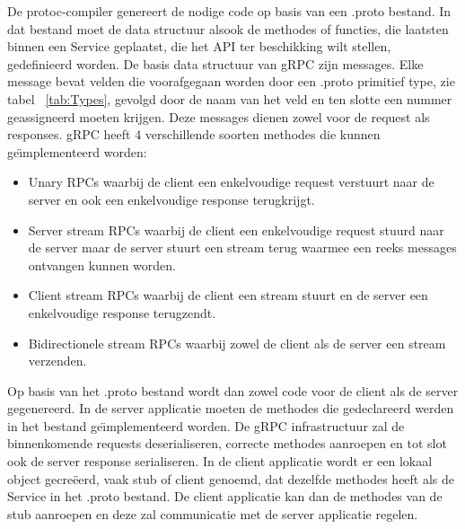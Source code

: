De protoc-compiler genereert de nodige code op basis van een .proto bestand. In dat bestand moet de data structuur alsook de methodes
of functies, die laatsten binnen een Service geplaatst, die het API ter beschikking wilt stellen, gedefinieerd worden.
De basis data structuur van gRPC zijn messages. Elke message bevat velden
die voorafgegaan worden door een .proto primitief type, zie tabel ~\ref{tab:Types}, gevolgd door de naam van het veld en ten slotte een nummer
geassigneerd moeten krijgen. Deze messages dienen zowel voor de request als responses.
gRPC heeft 4 verschillende soorten methodes die kunnen ge\"{\i}mplementeerd worden:
\begin{itemize}
    \item Unary RPCs waarbij de client een enkelvoudige request verstuurt naar de server en ook een enkelvoudige response terugkrijgt.
    \item Server stream RPCs waarbij de client een enkelvoudige request stuurd naar de server maar de server stuurt een stream terug
    waarmee een reeks messages ontvangen kunnen worden.
    \item Client stream RPCs waarbij de client een stream stuurt en de server een enkelvoudige response terugzendt.
    \item Bidirectionele stream RPCs waarbij zowel de client als de server een stream verzenden.
\end{itemize}
Op basis van het .proto bestand wordt dan zowel code voor de client als de server gegenereerd. In de server applicatie moeten de methodes die gedeclareerd werden
in het bestand ge\"{\i}mplementeerd worden. De gRPC infrastructuur zal de binnenkomende requests deserialiseren, correcte methodes aanroepen en tot slot ook
de server response serialiseren. In de client applicatie wordt er een lokaal object gecre\"eerd, vaak stub of client genoemd, dat dezelfde methodes heeft als de Service in
het .proto bestand. De client applicatie kan dan de methodes van de stub aanroepen en deze zal communicatie met de server applicatie regelen.\newline
~\autocite{grpcintroduction}\\
~\autocite{grpccoreconcepts}\\

